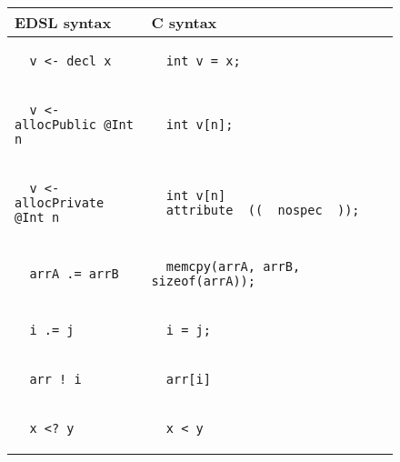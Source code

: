 \documentclass[10pt, conference]{IEEEtran}
\begin{document}
\begin{figure}[h]
\begin{tabular}{|l|l|}
  \hline
  EDSL syntax & C syntax \\
  \hline
  \begin{lstlisting}
  v <- decl x
  \end{lstlisting}
  & \begin{lstlisting}
  int v = x;
  \end{lstlisting}\\

  \hline
  \begin{lstlisting}
  v <- allocPublic @Int n
  \end{lstlisting}
  & \begin{lstlisting}
  int v[n];
  \end{lstlisting}\\

  \hline
  \begin{lstlisting}
  v <- allocPrivate @Int n
  \end{lstlisting}
  & \begin{lstlisting}
  int v[n] __attribute__((__nospec__));
  \end{lstlisting}\\

  \hline
  \begin{lstlisting}
  arrA .= arrB
  \end{lstlisting}
  & \begin{lstlisting}
  memcpy(arrA, arrB, sizeof(arrA));
  \end{lstlisting}\\

  \hline
  \begin{lstlisting}
  i .= j
  \end{lstlisting}
  & \begin{lstlisting}
  i = j;
  \end{lstlisting}\\

  \hline
  \begin{lstlisting}
  arr ! i
  \end{lstlisting}
  & \begin{lstlisting}
  arr[i]
  \end{lstlisting}\\

  \hline
  \begin{lstlisting}
  x <? y
  \end{lstlisting}
  & \begin{lstlisting}
  x < y
  \end{lstlisting}\\


\end{tabular}
\end{figure}
\end{document}
